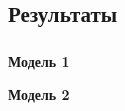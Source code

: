 \subsection{Результаты}

\begin{frame}
\frametitle{\insertsection}
\framesubtitle{\insertsubsection}

\vspace{-0.5cm}
\begin{minipage}[t]{0.47\linewidth}
    \textbf{Модель 1}
\end{minipage}
\hfill
\begin{minipage}[t]{0.47\linewidth}
    \textbf{Модель 2}
\end{minipage}

\end{frame}


% 
% 
% 
% 


